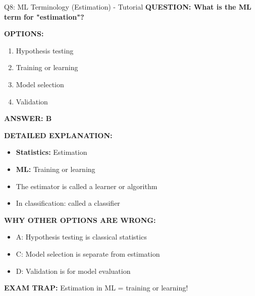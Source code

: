 \documentclass[8pt]{beamer}
\begin{document}
	\begin{frame}{Q8: ML Terminology (Estimation) - Tutorial}
		\fontsize{6.5}{7.5}\selectfont
		\textbf{QUESTION: What is the ML term for "estimation"?}
		
		\vspace{0.1cm}
		\textbf{OPTIONS:}
		\begin{enumerate}
			\item Hypothesis testing
			\item Training or learning
			\item Model selection
			\item Validation
		\end{enumerate}
		
		\vspace{0.1cm}
		\textcolor{myblue}{\textbf{ANSWER: B}}
		
		\vspace{0.1cm}
		\textbf{DETAILED EXPLANATION:}
		\begin{itemize}
			\item \textbf{Statistics:} Estimation
			\item \textbf{ML:} Training or learning
			\item The estimator is called a learner or algorithm
			\item In classification: called a classifier
		\end{itemize}
		
		\vspace{0.1cm}
		\textcolor{myred}{\textbf{WHY OTHER OPTIONS ARE WRONG:}}
		\begin{itemize}
			\item \textcolor{myred}{A:} Hypothesis testing is classical statistics
			\item \textcolor{myred}{C:} Model selection is separate from estimation
			\item \textcolor{myred}{D:} Validation is for model evaluation
		\end{itemize}
		
		\textcolor{myred}{\textbf{EXAM TRAP:}} Estimation in ML = \textcolor{myblue}{training or learning}!
	\end{frame}
	
\end{document}
